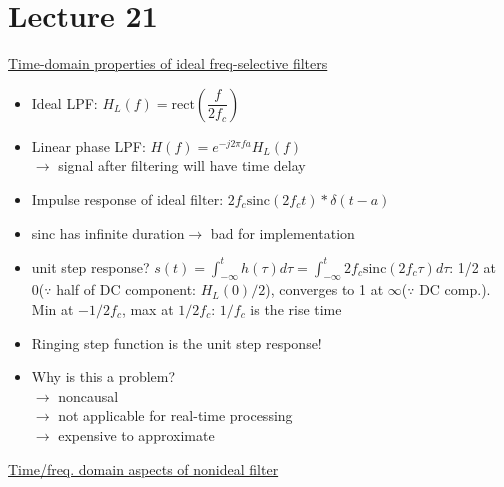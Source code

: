 \documentclass{article}
\newcommand{\rect}[1]{\mathrm{rect}\left(#1\right)}
\newcommand{\sinc}[1]{\mathrm{sinc}\left(#1\right)}
\begin{document}
\section{Lecture 21}
\underline{Time-domain properties of ideal freq-selective filters}
\begin{itemize}
    \item Ideal LPF: $H_L(f)=\rect{\dfrac{f}{2f_c}}$
    \item Linear phase LPF: $H(f)=e^{-j2\pi fa}H_L(f)$\\
    $\rightarrow$ signal after filtering will have time delay
    \item Impulse response of ideal filter: $2f_c\sinc{2f_ct}*\delta(t-a)$
    \item sinc has infinite duration$\rightarrow$ bad for implementation
    \item unit step response? $s(t)=\displaystyle{\int_{-\infty}^{t}h(\tau)d\tau=\int_{-\infty}^{t}2f_c\sinc{2f_c\tau}d\tau}$: 1/2 at 0($\because$ half of DC component: $H_L(0)/2$), converges to 1 at $\infty$($\because$ DC comp.).\\
    Min at $-1/2f_c$, max at $1/2f_c$: $1/f_c$ is the rise time
    \item Ringing step function is the unit step response!
    \item Why is this a problem?\\$\rightarrow$ noncausal\\$\rightarrow$ not applicable for real-time processing\\$\rightarrow$ expensive to approximate
\end{itemize}
\underline{Time/freq. domain aspects of nonideal filter}
\end{document}
